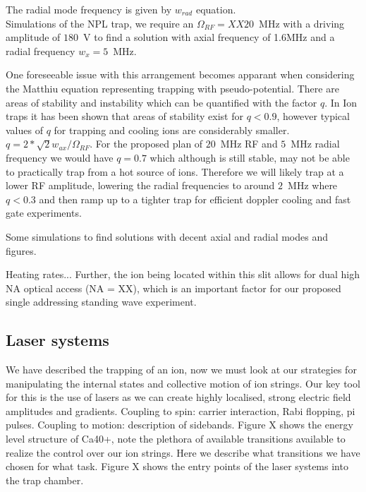 \documentclass[12pt]{iopart}
\begin{document}
The radial mode frequency is given by
$w_{rad}$ equation. \\
Simulations of the NPL trap,
we require an $\Omega_{RF} = XX20$~MHz with a driving amplitude of
$180$~V to find a solution with axial frequency of 1.6MHz and a radial
frequency $w_x = 5$~MHz.

One foreseeable issue with this arrangement becomes apparant when
considering the Matthiu equation representing trapping with
pseudo-potential. There are areas of stability and instability which
can be quantified with the factor $q$. In Ion traps it has been shown
that areas of stability exist for $q<0.9$, however typical values of
$q$ for trapping and cooling ions are considerably smaller.
$q = 2*\sqrt{2}w_{ax}/\Omega_{RF}$.
For the proposed plan of $20$~MHz RF and $5$~MHz radial frequency we
would have $q = 0.7$ which although is still stable, may not be able
to practically trap from a hot source of ions. Therefore we will
likely trap at a lower RF amplitude, lowering the radial frequencies
to around $2$~MHz where $q<0.3$ and then ramp up to a tighter trap for
efficient doppler cooling and fast gate experiments.

Some simulations to find solutions with decent axial and radial modes and figures.

Heating rates... Further, the ion being located within this
slit allows for dual high NA optical access (NA = XX), which is an
important factor for our proposed single addressing standing wave
experiment.

\subsection{Laser systems}

We have described the trapping of an ion, now we must look at our
strategies for manipulating the internal states and collective motion
of ion strings. Our key tool for this is the use of lasers as we can
create highly localised, strong electric field amplitudes and
gradients. Coupling to spin: carrier interaction, Rabi flopping, pi
pulses. Coupling to motion: description of sidebands.
Figure X shows the energy level structure of Ca40+, note the plethora
of available transitions available to realize the control over our ion
strings. Here we describe what transitions we have chosen for what
task.
Figure X shows the entry points of the laser systems into the trap
chamber.
\end{document}
